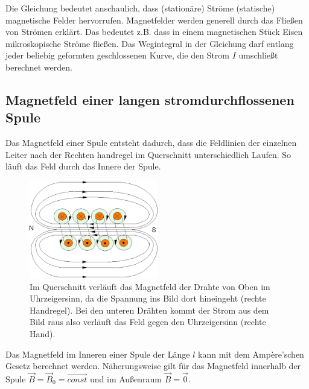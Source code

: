 \documentclass{scrartcl}
\begin{document}
\noindent Die Gleichung bedeutet anschaulich, dass (stationäre) Ströme (statische) magnetische Felder hervorrufen.
Magnetfelder werden generell durch das Fließen von Strömen erklärt.
Das bedeutet z.B. dass in einem magnetischen Stück Eisen mikroskopische Ströme fließen.
Das Wegintegral in der Gleichung darf entlang jeder beliebig geformten geschlossenen Kurve, die den Strom $I$ umschließt berechnet werden.

\subsection{Magnetfeld einer langen stromdurchflossenen Spule}
Das Magnetfeld einer Spule entsteht dadurch, dass die Feldlinien der einzelnen Leiter nach der Rechten handregel im Querschnitt unterschiedlich Laufen. So 
läuft das Feld durch das Innere der Spule.
\begin{figure}[H]
    \centering
    \includegraphics[width=0.5\textwidth]{Magnetfeld Spule.png}
    \caption{Im Querschnitt verläuft das Magnetfeld der Drahte von Oben im Uhrzeigersinn, da die Spannung ins Bild dort hineingeht (rechte Handregel). Bei den unteren Drähten kommt der Strom aus dem Bild raus also verläuft das Feld gegen den Uhrzeigersinn (rechte Hand). }
\end{figure}
Das Magnetfeld im Inneren einer Spule der Länge $l$ kann mit dem Ampère'schen Gesetz berechnet werden.
Näherungsweise gilt für das Magnetfeld innerhalb der Spule $\vec{B}=\vec{B}_0=\vec{const}$ und im Außenraum $\vec{B}=\vec{0}$.
\end{document}
